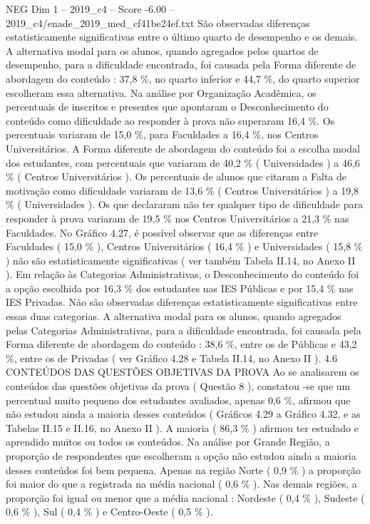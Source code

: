 \begin{textsample}{NEG Dim 1 – 2019\_c4 – Score -6.00 – 2019\_c4/enade\_2019\_med\_cf41be24ef.txt}
São observadas diferenças estatisticamente significativas entre o último quarto de desempenho e os demais.
A alternativa modal para os alunos, quando agregados pelos quartos de desempenho, para a dificuldade encontrada, foi causada pela Forma diferente de abordagem do conteúdo : 37,8 \%, no quarto inferior e 44,7 \%, do quarto superior escolheram essa alternativa.
Na análise por Organização Acadêmica, os percentuais de inscritos e presentes que apontaram o Desconhecimento do conteúdo como dificuldade ao responder à prova não superaram 16,4 \%.
Os percentuais variaram de 15,0 \%, para Faculdades a 16,4 \%, nos Centros Universitários.
A Forma diferente de abordagem do conteúdo foi a escolha modal dos estudantes, com percentuais que variaram de 40,2 \% ( Universidades ) a 46,6 \% ( Centros Universitários ).
Os percentuais de alunos que citaram a Falta de motivação como dificuldade variaram de 13,6 \% ( Centros Universitários ) a 19,8 \% ( Universidades ).
Os que declararam não ter qualquer tipo de dificuldade para responder à prova variaram de 19,5 \% nos Centros Universitários a 21,3 \% nas Faculdades.
No Gráfico 4.27, é possível observar que as diferenças entre Faculdades ( 15,0 \% ), Centros Universitários ( 16,4 \% ) e Universidades ( 15,8 \% ) não são estatisticamente significativas ( ver também Tabela II.14, no Anexo II ).
Em relação às Categorias Administrativas, o Desconhecimento do conteúdo foi a opção escolhida por 16,3 \% dos estudantes nas IES Públicas e por 15,4 \% nas IES Privadas.
Não são observadas diferenças estatisticamente significativas entre essas duas categorias.
A alternativa modal para os alunos, quando agregados pelas Categorias Administrativas, para a dificuldade encontrada, foi causada pela Forma diferente de abordagem do conteúdo : 38,6 \%, entre os de Públicas e 43,2 \%, entre os de Privadas ( ver Gráfico 4.28 e Tabela II.14, no Anexo II ). 4.6 CONTEÚDOS DAS QUESTÕES OBJETIVAS DA PROVA Ao se analisarem os conteúdos das questões objetivas da prova ( Questão 8 ), constatou -se que um percentual muito pequeno dos estudantes avaliados, apenas 0,6 \%, afirmou que não estudou ainda a maioria desses conteúdos ( Gráficos 4.29 a Gráfico 4.32, e as Tabelas II.15 e II.16, no Anexo II ).
A maioria ( 86,3 \% ) afirmou ter estudado e aprendido muitos ou todos os conteúdos.
Na análise por Grande Região, a proporção de respondentes que escolheram a opção não estudou ainda a maioria desses conteúdos foi bem pequena.
Apenas na região Norte ( 0,9 \% ) a proporção foi maior do que a registrada na média nacional ( 0,6 \% ).
Nas demais regiões, a proporção foi igual ou menor que a média nacional : Nordeste ( 0,4 \% ), Sudeste ( 0,6 \% ), Sul ( 0,4 \% ) e Centro-Oeste ( 0,5 \% ).

\end{textsample}
